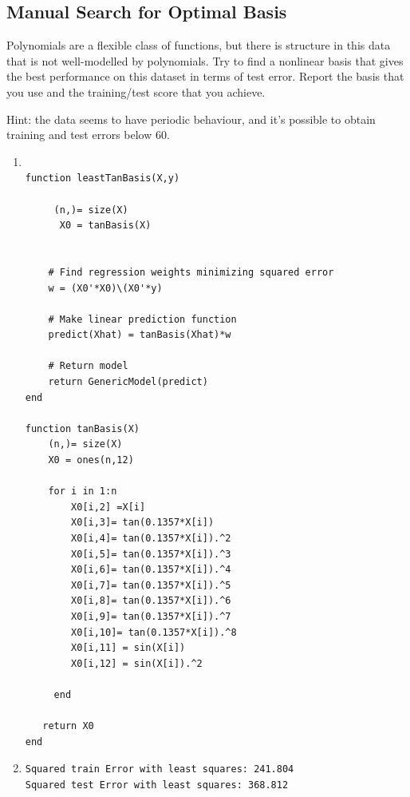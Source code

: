 \documentclass{article}
\def\blu#1{{\color{blu}#1}}
\begin{document}
\subsection{Manual Search for Optimal Basis}

Polynomials are a flexible class of functions, but there is structure in this data that is not well-modelled by polynomials. Try to find a nonlinear basis that gives the best performance on this dataset in terms of test error. \blu{Report the basis that you use and the training/test score that you achieve}.

Hint: the data seems to have periodic behaviour, and it's possible to obtain training and test errors below 60.

\begin{enumerate}
\item
 \begin{verbatim}

function leastTanBasis(X,y)

     (n,)= size(X)
      X0 = tanBasis(X)


    # Find regression weights minimizing squared error
    w = (X0'*X0)\(X0'*y)

    # Make linear prediction function
    predict(Xhat) = tanBasis(Xhat)*w

    # Return model
    return GenericModel(predict)
end

function tanBasis(X)
    (n,)= size(X)
    X0 = ones(n,12)

    for i in 1:n
        X0[i,2] =X[i]
        X0[i,3]= tan(0.1357*X[i])
        X0[i,4]= tan(0.1357*X[i]).^2
        X0[i,5]= tan(0.1357*X[i]).^3
        X0[i,6]= tan(0.1357*X[i]).^4
        X0[i,7]= tan(0.1357*X[i]).^5
        X0[i,8]= tan(0.1357*X[i]).^6
        X0[i,9]= tan(0.1357*X[i]).^7
        X0[i,10]= tan(0.1357*X[i]).^8
        X0[i,11] = sin(X[i])  
        X0[i,12] = sin(X[i]).^2  
         
     end 

   return X0
end

 \end{verbatim}


\item

  \begin{verbatim}
Squared train Error with least squares: 241.804 
Squared test Error with least squares: 368.812
  \end{verbatim}

\end{enumerate}
\end{document}
